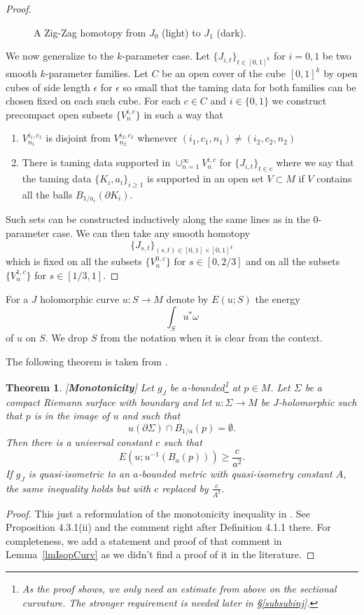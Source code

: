 \documentclass[11pt]{amsart}
\newtheorem{tm}{Theorem}[section]
\theoremstyle{definition}
\theoremstyle{remark}
\begin{document}
\begin{proof}
\begin{figure}[h]
\caption{A Zig-Zag homotopy from $J_0$ (light) to $J_1$ (dark). }
\end{figure}
We now generalize to the $k$-parameter case. Let $\{J_{i,t}\}_{t\in[0,1]^k}$ for $i=0,1$ be two smooth $k$-parameter families.  Let $C$ be an open cover of the cube $[0,1]^k$ by open cubes of side length $\epsilon$ for $\epsilon$ so small that the taming data for both families can be chosen fixed on each such cube. For each $c\in C$ and $i\in \{0,1\}$ we construct precompact open subsets $\{V^{i,c}_n\}$ in such a way that
\begin{enumerate}
\item
$V^{i_1,c_1}_{n_1}$ is disjoint from $V^{i_2,c_2}_{n_2}$ whenever $(i_1,c_1,n_1)\neq (i_2,c_2,n_2)$
\item
There is taming data supported in $\cup_{n=1}^{\infty}V^{i,c}_n$ for $\{J_{i,t}\}_{t\in c}$ where we say that the taming data $\{K_i,a_i\}_{i\geq 1}$ is supported in an open set $V\subset M$ if $V$ contains all the balls $B_{1/a_i}(\partial K_i)$.
\end{enumerate}
Such sets can be constructed inductively along the same lines as in the $0$-parameter case. We can then take any smooth homotopy
\[
\{J_{s,t}\}_{(s,t)\in[0,1]\times[0,1]^k}
\]
which is fixed on all the subsets $\{V^{0,c}_n\}$ for $s\in[0,2/3]$ and on all the subsets $\{V^{1,c}_n\}$ for $s\in [1/3,1]$.
\end{proof}
For a $J$ holomorphic curve $u:S\to M$ denote by $E(u;S)$ the energy
\[
\int_Su^*\omega
\]
of $u$ on $S$. We drop $S$ from the notation when it is clear from the context.

The following theorem is taken from \cite{Sikorav94}.
\begin{tm}\label{tmMonontonicity}[\textbf{Monotonicity}]
Let $g_J$ be $a$-bounded\footnote{As the proof shows, we only need an estimate from above on the sectional curvature. The  stronger requirement is needed later in \S\ref{subsubinj}.} at $p\in M$. Let $\Sigma$ be a compact Riemann surface with boundary and let $u:\Sigma\to M$ be $J$-holomorphic such that $p$ is in the image of $u$ and such that
\[
u(\partial \Sigma)\cap B_{1/a}(p)=\emptyset.
\]
Then there is a universal constant $c$ such that
\[
E\left(u;u^{-1}(B_a(p))\right)\geq\frac c{a^2}.
\]
If $g_J$ is quasi-isometric to an $a$-bounded metric with quasi-isometry constant $A$, the same inequality holds but with $c$ replaced by $\frac{c}{A^2}$.
\end{tm}

\begin{proof}
This just a reformulation of the monotonicity inequality in \cite{Sikorav94}. See Proposition 4.3.1(ii) and the comment right after Definition 4.1.1 there. For completeness, we add a statement and proof of that comment in Lemma~\ref{lmIsopCurv} as we didn't find a proof of it in the literature.
\end{proof}
\end{document}
